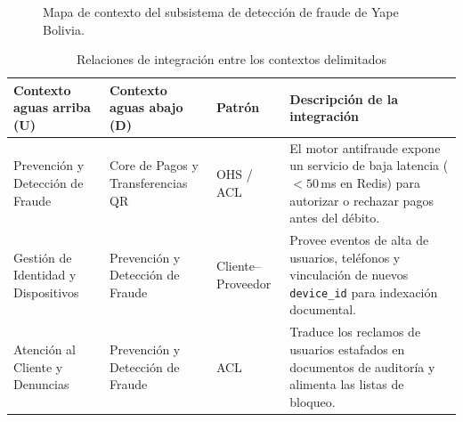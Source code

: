 \documentclass[11pt,a4paper]{article}
\begin{document}
	\begin{figure}[H]
		\centering
		\caption{Mapa de contexto del subsistema de detección de fraude de Yape Bolivia.}
	\end{figure}
	
	\begin{table}[H]
		\centering
		\caption{Relaciones de integración entre los contextos delimitados}
		\small
		\begin{tabularx}{\textwidth}{>{\raggedright\arraybackslash}p{3cm}>{\raggedright\arraybackslash}p{3cm}>{\raggedright\arraybackslash}p{1.9cm}Y}
			\toprule
			\textbf{Contexto aguas arriba (U)} & \textbf{Contexto aguas abajo (D)} & \textbf{Patrón} & \textbf{Descripción de la integración} \\
			\midrule
			Prevención y Detección de Fraude & Core de Pagos y Transferencias QR & OHS / ACL & El motor antifraude expone un servicio de baja latencia ($<50$\,ms en Redis) para autorizar o rechazar pagos antes del débito. \\
			Gestión de Identidad y Dispositivos & Prevención y Detección de Fraude & Cliente--Proveedor & Provee eventos de alta de usuarios, teléfonos y vinculación de nuevos \texttt{device\_id} para indexación documental. \\
			Atención al Cliente y Denuncias & Prevención y Detección de Fraude & ACL & Traduce los reclamos de usuarios estafados en documentos de auditoría y alimenta las listas de bloqueo. \\
			\bottomrule
		\end{tabularx}
	\end{table}
	
\end{document}
